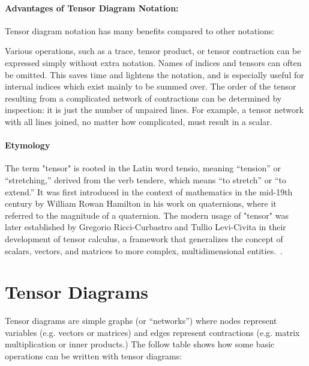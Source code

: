 \paragraph{Advantages of Tensor Diagram Notation:}
Tensor diagram notation has many benefits compared to other notations:

Various operations, such as a trace, tensor product, or tensor contraction can be expressed simply without extra notation.
Names of indices and tensors can often be omitted. This saves time and lightens the notation, and is especially useful for internal indices which exist mainly to be summed over.
The order of the tensor resulting from a complicated network of contractions can be determined by inspection: it is just the number of unpaired lines. For example, a tensor network with all lines joined, no matter how complicated, must result in a scalar.


\paragraph{Etymology}
The term "tensor" is rooted in the Latin word tensio, meaning ``tension'' or ``stretching,'' derived from the verb tendere, which means ``to stretch'' or ``to extend.''
It was first introduced in the context of mathematics in the mid-19th century by William Rowan Hamilton in his work on quaternions, where it referred to the magnitude of a quaternion.
The modern usage of "tensor" was later established by Gregorio Ricci-Curbastro and Tullio Levi-Civita in their development of tensor calculus, a framework that generalizes the concept of scalars, vectors, and matrices to more complex, multidimensional entities.~\cite{tensor_etymology_russo, hamilton_tensor}.


\tableofcontents
\clearpage


\section{Tensor Diagrams}
Tensor diagrams are simple graphs (or ``networks'') where
nodes represent variables (e.g. vectors or matrices) and edges represent
contractions (e.g. matrix multiplication or inner products.)
The follow table shows how some basic operations can be written with tensor diagrams:

\newenvironment{compress}{
  \renewcommand{\arraystretch}{0.6} %
  \setlength{\arraycolsep}{2pt}     %
  \vspace{.3em}
}{
  \vspace{.3em}
  \renewcommand{\arraystretch}{1}   %
  \setlength{\arraycolsep}{5pt}     %
}

